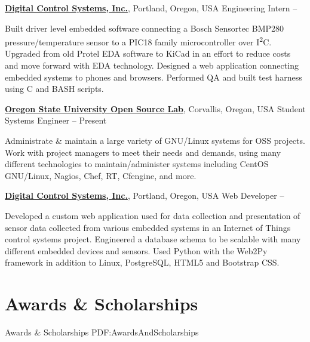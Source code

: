 \documentclass[letterpaper,MMMyyyy,nonstop]{simpleresumecv}
\begin{document}
\begin{body}
\href{http://www.dcs-inc.net}
{\textbf{Digital Control Systems, Inc.}},
Portland, Oregon, USA
\GapNoBreak
\BulletItem
Engineering Intern
\hfill
{} --
\begin{detail}
\SubBulletItem
Built driver level embedded software connecting a Bosch Sensortec BMP280 pressure/temperature sensor to a PIC18 family microcontroller over I\textsuperscript{2}C.
\SubBulletItem
Upgraded from old Protel EDA software to KiCad in an effort to reduce costs and move forward with EDA technology.
\SubBulletItem
Designed a web application connecting embedded systems to phones and browsers. Performed QA and built test harness using C and BASH scripts.
\end{detail}

\href{http://www.osuosl.org}
{\textbf{Oregon State University Open Source Lab}},
Corvallis, Oregon, USA
\GapNoBreak
\BulletItem
Student Systems Engineer
\hfill
{} --
Present
\begin{detail}
\SubBulletItem
Administrate \& maintain a large variety of GNU/Linux systems for OSS projects.
\SubBulletItem
Work with project managers to meet their needs and demands, using many different technologies to maintain/administer systems including CentOS GNU/Linux, Nagios, Chef, RT, Cfengine, and more.
\end{detail}

\href{http://www.dcs-inc.net}
{\textbf{Digital Control Systems, Inc.}},
Portland, Oregon, USA
\GapNoBreak
\BulletItem
Web Developer
\hfill
{} --
\begin{detail}
\SubBulletItem
Developed a custom web application used for data collection and presentation of sensor data collected from various embedded systems in an Internet of Things control systems project.
\SubBulletItem
Engineered a database schema to be scalable with many different embedded devices and sensors.
\SubBulletItem
Used Python with the Web2Py framework in addition to Linux, PostgreSQL, HTML5 and Bootstrap CSS.
\end{detail}


\section
{Awards \&\newline
Scholarships}
{Awards \& Scholarships}
{PDF:AwardsAndScholarships}


\end{body}
\end{document}
